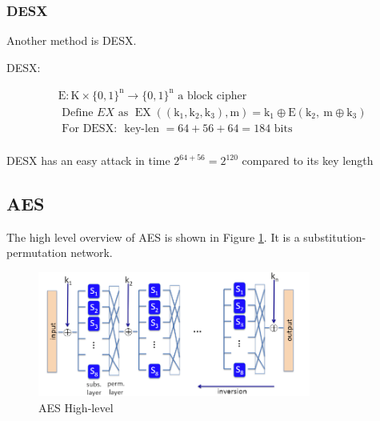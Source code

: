 \subsubsection{DESX}

Another method is DESX.

\begin{method} [DESX] DESX: 

    \begin{equation}
        \begin{aligned}
            &\mathrm{E}: \mathrm{K} \times\{0,1\}^{\mathrm{n}} \longrightarrow\{0,1\}^{\mathrm{n}} \text { a block cipher } \\
            &\text { Define } E X \text { as } \operatorname{EX}\left(\left(\mathrm{k}_{1}, \mathrm{k}_{2}, \mathrm{k}_{3}\right), \mathrm{m}\right)=\mathrm{k}_{1} \oplus \mathrm{E}\left(\mathrm{k}_{2}, \mathrm{~m} \oplus \mathrm{k}_{3}\right) \\
            &\text { For DESX: } \text { key-len }=64+56+64=184 \text { bits } \\
        \end{aligned}
    \end{equation}
    
\end{method}

DESX has an easy attack in time $2^{64+56}=2^{120}$ compared to its key length


\subsection{AES}

The high level overview of AES is shown in Figure \ref{fig: 03 AES High-level}. It is a substitution-permutation network.

\begin{figure}[h]
    \centering
    \includegraphics[width=0.8\textwidth]{Stanford_Crypto_1/fig/03_block_cipher/AES High-level.png}
    \caption{AES High-level}
    \label{fig: 03 AES High-level}
\end{figure}


